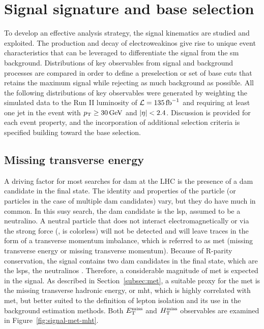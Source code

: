 \clearpage
\section{Signal signature and base selection}
\label{sec:signal-signature}

To develop an effective analysis strategy, the signal kinematics are studied and exploited. The production and decay of electroweakinos give rise to unique event characteristics that can be leveraged to differentiate the signal from the \gls{sm} background. Distributions of key observables from signal and background processes are compared in order to define a preselection or set of base cuts that retains the maximum signal while rejecting as much background as possible. All the following distributions of key observables were generated by weighting the simulated data to the Run II luminosity of $\mathcal{L} = 135 \mbox{\ensuremath{\,\text{fb}^{-1}}}$ and requiring at least one jet in the event with $p_{\mathrm{T}} \geq 30\,\text{Ge\hspace{-.08em}V}$ and $\abs{\eta}<2.4$. Discussion is provided for each event property, and the incorporation of additional selection criteria is specified building toward the base selection. 

\subsection{Missing transverse energy}
\label{subsec:signal-met-mht}

A driving factor for most searches for \gls{dam} at the LHC is the presence of a \gls{dam} candidate in the final state. The identity and properties of the particle (or particles in the case of multiple \gls{dam} candidates) vary, but they do have much in common. In this \gls{susy} search, the \gls{dam} candidate is the \gls{lsp}, assumed to be a \gls{neutralino}. A neutral particle that does not interact electromagnetically or via the strong force (\ie, is colorless) will not be detected and will leave traces in the form of a transverse momentum imbalance, which is referred to as \gls{met} (missing transverse energy or missing transverse momentum). Because of R-parity conservation, the signal contains two \gls{dam} candidates in the final state, which are the \glspl{lsp}, the \glspl{neutralino} \neuto. Therefore, a considerable magnitude of \gls{met} is expected in the signal. As described in Section~\ref{subsec:met}, a suitable proxy for the \gls{met} is the missing transverse hadronic energy, or \gls{mht}, which is highly correlated with \gls{met}, but better suited to the definition of lepton isolation and its use in the background estimation methods. Both $E_{\mathrm{T}}^{\text{miss}}$ and $H_{\mathrm{T}}^{\text{miss}}$ observables are examined in Figure~\ref{fig:signal-met-mht}.


